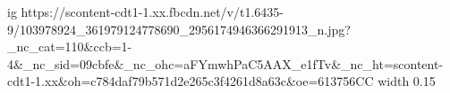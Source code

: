  
 
 
 
 

\par
\ifcmt
  ig https://scontent-cdt1-1.xx.fbcdn.net/v/t1.6435-9/103978924_361979124778690_2956174946366291913_n.jpg?_nc_cat=110&ccb=1-4&_nc_sid=09cbfe&_nc_ohc=aFYmwhPaC5AAX_e1fTv&_nc_ht=scontent-cdt1-1.xx&oh=c784daf79b571d2e265c3f4261d8a63c&oe=613756CC
  width 0.15
\fi

